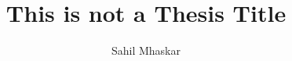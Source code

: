 
\newcommand*{\setsupervisor}[1]{\def\supervisorname{#1}}
\newcommand*{\setsupervisoremail}[1]{\def\supervisoremail{#1}}
\newcommand*{\thesistitle}[1]{\title{#1}}
\newcommand*{\examiner}[1]{\def\examname{#1}}
\newcommand*{\degree}[1]{\def\degreename{#1}}
\newcommand*{\authors}[1]{\author{#1}}
\newcommand*{\addresses}[1]{\def\addressnames{#1}}
\newcommand*{\university}[1]{\def\univname{#1}}
\newcommand*{\UNIVERSITY}[1]{\def\UNIVNAME{#1}}
\newcommand*{\department}[1]{\def\deptname{#1}}
\newcommand*{\DEPARTMENT}[1]{\def\DEPTNAME{#1}}
\newcommand*{\group}[1]{\def\groupname{#1}}
\newcommand*{\GROUP}[1]{\def\GROUPNAME{#1}}
\newcommand*{\faculty}[1]{\def\facname{#1}}
\newcommand*{\FACULTY}[1]{\def\FACNAME{#1}}
\newcommand*{\subject}[1]{\def\subjectname{#1}}
\newcommand*{\keywords}[1]{\def\keywordnames{#1}}
\newcommand*{\submissiondate}[1]{\def\sdate{#1}}
\newcommand*{\emailauthor}[1]{\def\@emailauthor{#1}}

\thesistitle{This is not a Thesis Title}  %

\setsupervisor{C. Aiswarya, M. Praveen}  %
\setsupervisoremail{aiswarya@cmi.ac.in, praveenm@cmi.ac.in}  %

\authors{Sahil Mhaskar}  %
\emailauthor{archit@cmi.ac.in}  %

\submissiondate{July 2025}  %

